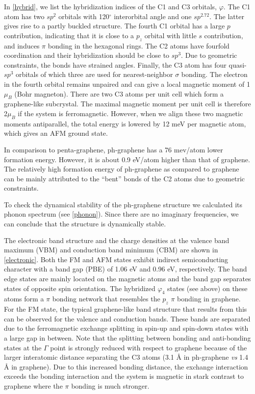 In \autoref{hybrid}, we list the hybridization indices of the C1 and C3 orbitals, $\varphi$.  The C1 atom has two $sp^2$ orbitals with 120$^{\circ}$ interorbital angle and one $sp^{2.72}$. The latter gives rise to a partly buckled structure. The fourth C1 orbital has a large $p$ contribution, indicating that it is close to a $p_z$ orbital with little $s$ contribution, and induces $\pi$ bonding in the hexagonal rings. The C2 atoms have fourfold coordination and their hybridization should be close to $sp^3$. Due to geometric constraints, the bonds have strained angles\cite{coulson1949}. Finally, the C3 atom has four quasi-$sp^3$ orbitals of which three are used for nearest-neighbor $\sigma$ bonding. The electron in the fourth orbital remains unpaired and can give a local magnetic moment of 1 $\mu_B$ (Bohr magneton). There are two C3 atoms per unit cell which form a graphene-like subcrystal. The maximal magnetic moment per unit cell is therefore  2$\mu_B$ if the system is ferromagnetic. However, when we align these two magnetic moments antiparallel, the total energy is lowered by 12 meV per magnetic atom, which gives an AFM ground state. 

In comparison to penta-graphene, ph-graphene has a 76 mev/atom lower formation energy. However, it is about 0.9 eV/atom higher than that of graphene. The relatively high formation energy of ph-graphene as compared to graphene can be mainly attributed to the ``bent'' bonds of the C2 atoms due to geometric constraints. 



To check the dynamical stability of the ph-graphene structure we calculated its phonon spectrum (see \autoref{phonon}). Since there are no imaginary frequencies, we can conclude that the structure is dynamically stable.




The electronic band structure and the charge densities at the valence band maximum (VBM) and conduction band minimum (CBM) are shown in \autoref{electronic}. Both the FM and AFM states exhibit indirect semiconducting character with a band gap (PBE) of 1.06 eV and 0.96 eV, respectively. The band edge states are mainly located on the magnetic atoms and the band gap separates states of opposite spin orientation. The hybridized $\varphi_4$ states (see above) on these atoms form a $\pi$ bonding network that resembles the $p_z$ $\pi$ bonding in graphene. For the FM state, the typical graphene-like band structure that results from this can be observed for the valence and conduction bands. These bands are separated due to the ferromagnetic exchange splitting in spin-up and spin-down states with a large gap in between. Note that the splitting between bonding and anti-bonding states at the $\Gamma$ point is strongly reduced with respect to graphene because of the larger interatomic distance separating the C3 atoms (3.1 {\AA} in ph-graphene \textit{vs} 1.4 {\AA} in graphene). Due to this increased bonding distance, the exchange interaction exceeds the bonding interaction and the system is magnetic in stark contrast to graphene where the $\pi$ bonding is much stronger.


